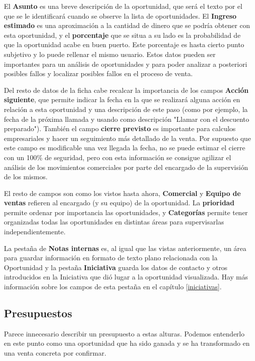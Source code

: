 El \textbf{Asunto} es una breve descripción de la oportunidad, que será el texto por el que se le identificará cuando se observe la lista de oportunidades. El \textbf{Ingreso estimado} es una aproximación a la cantidad de dinero que se podría obtener con esta oportunidad, y el \textbf{porcentaje} que se situa a su lado es la probabilidad de que la oportunidad acabe en buen puerto. Este porcentaje es hasta cierto punto subjetivo y lo puede rellenar el mismo usuario. Estos datos pueden ser importantes para un análisis de oportunidades y para poder
analizar a posteriori posibles fallos y localizar posibles fallos en el proceso de venta.

Del resto de datos de la ficha cabe recalcar la importancia de los campos \textbf{Acción siguiente}, que permite indicar la fecha en la que
se realizará alguna acción en relación a esta oportunidad y una descripción de este paso (como por ejemplo, la fecha de la próxima llamada y usando como descripción "Llamar con el descuento preparado"). También el campo \textbf{cierre previsto} es importante para calculos
empresariales y hacer un seguimiento más detallado de la venta. Por supuesto que este campo es modificable una vez llegada la fecha,
no se puede estimar el cierre con un 100\% de seguridad, pero con esta información se consigue agilizar el análisis de los movimientos comerciales por parte del encargado de la supervisión de los mismos.

El resto de campos son como los vistos hasta ahora, \textbf{Comercial} y \textbf{Equipo de ventas} refieren al encargado (y su equipo) de
la oportunidad. La \textbf{prioridad} permite ordenar por importancia las oportunidades, y \textbf{Categorías} permite tener organizadas
todas las oportunidades en distintas áreas para supervisarlas independientemente.

La pestaña de \textbf{Notas internas} es, al igual que las vistas anteriormente, un área para guardar información en formato de texto 
plano relacionada con la Oportunidad y la pestaña \textbf{Iniciativa} guarda los datos de contacto y otros introducidos en la Iniciativa
que dió lugar a la oportunidad visualizada. Hay más información sobre los campos de esta pestaña en el capítulo \ref{iniciativas}.


\subsection{Presupuestos}
\label{presupuestos}
Parece innecesario describir un presupuesto a estas alturas. Podemos entenderlo en este punto como una oportunidad que ha sido ganada
y se ha transformado en una venta concreta por confirmar.

